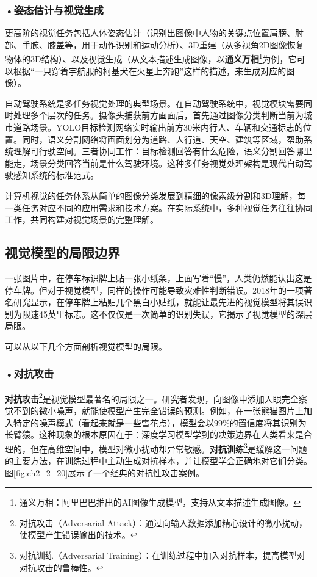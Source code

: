 \subsubsection*{\textbf{•姿态估计与视觉生成}}

更高阶的视觉任务包括人体姿态估计（识别出图像中人物的关键点位置肩膀、肘部、手腕、膝盖等，用于动作识别和运动分析）、3D重建（从多视角2D图像恢复物体的3D结构）、以及视觉生成（从文本描述生成图像，以\textbf{通义万相}\footnote{通义万相：阿里巴巴推出的AI图像生成模型，支持从文本描述生成图像。}为例，它可以根据“一只穿着宇航服的柯基犬在火星上奔跑”这样的描述，来生成对应的图像）。

自动驾驶系统是多任务视觉处理的典型场景。在自动驾驶系统中，视觉模块需要同时处理多个层次的任务。摄像头捕获前方画面后，首先通过图像分类判断当前为城市道路场景。YOLO目标检测网络实时输出前方30米内行人、车辆和交通标志的位置。同时，语义分割网络将画面划分为道路、人行道、天空、建筑等区域，帮助系统理解可行驶空间。三者协同工作：目标检测回答有什么危险，语义分割回答哪里能走，场景分类回答当前是什么驾驶环境。这种多任务视觉处理架构是现代自动驾驶感知系统的标准范式。

计算机视觉的任务体系从简单的图像分类发展到精细的像素级分割和3D理解，每一类任务对应不同的应用需求和技术方案。在实际系统中，多种视觉任务往往协同工作，共同构建对视觉场景的完整理解。



\subsection{视觉模型的局限边界}

一张图片中，在停车标识牌上贴一张小纸条，上面写着“慢”，人类仍然能认出这是停车牌。但对于视觉模型，同样的操作可能导致灾难性判断错误。2018年的一项著名研究显示，在停车牌上粘贴几个黑白小贴纸，就能让最先进的视觉模型将其误识别为限速45英里标志。这不仅仅是一次简单的识别失误，它揭示了视觉模型的深层局限。

可以从以下几个方面剖析视觉模型的局限。

\subsubsection*{\textbf{•对抗攻击}}

\textbf{对抗攻击}\footnote{对抗攻击（Adversarial Attack）：通过向输入数据添加精心设计的微小扰动，使模型产生错误输出的技术。}是视觉模型最著名的局限之一。研究者发现，向图像中添加人眼完全察觉不到的微小噪声，就能使模型产生完全错误的预测。例如，在一张熊猫图片上加入特定的噪声模式（看起来就是一些雪花点），模型会以99\%的置信度将其识别为长臂猿。这种现象的根本原因在于：深度学习模型学到的决策边界在人类看来是合理的，但在高维空间中，模型对微小扰动却异常敏感。\textbf{对抗训练}\footnote{对抗训练（Adversarial Training）：在训练过程中加入对抗样本，提高模型对对抗攻击的鲁棒性。}是缓解这一问题的主要方法，在训练过程中主动生成对抗样本，并让模型学会正确地对它们分类。图\ref{fig:ch2_2_20}展示了一个经典的对抗性攻击案例。

